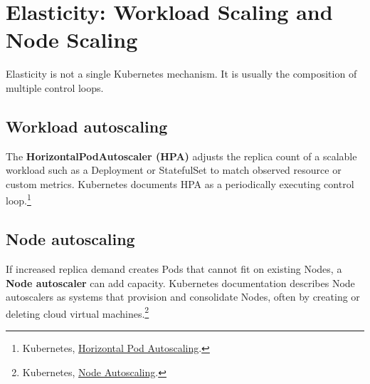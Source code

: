 \documentclass[11pt]{article}
\newcommand{\term}[1]{\textbf{\textcolor{KubeBlue}{#1}}}
\newcommand{\src}[2]{\href{#2}{#1}}
\begin{document}
\section{Elasticity: Workload Scaling and Node Scaling}

Elasticity is not a single Kubernetes mechanism. It is usually the composition of multiple control loops.

\subsection{Workload autoscaling}
The \term{HorizontalPodAutoscaler (HPA)} adjusts the replica count of a scalable workload such as a Deployment or StatefulSet to match observed resource or custom metrics. Kubernetes documents HPA as a periodically executing control loop.\footnote{Kubernetes, \src{Horizontal Pod Autoscaling}{https://kubernetes.io/docs/concepts/workloads/autoscaling/horizontal-pod-autoscale/}.}

\subsection{Node autoscaling}
If increased replica demand creates Pods that cannot fit on existing Nodes, a \term{Node autoscaler} can add capacity. Kubernetes documentation describes Node autoscalers as systems that provision and consolidate Nodes, often by creating or deleting cloud virtual machines.\footnote{Kubernetes, \src{Node Autoscaling}{https://kubernetes.io/docs/concepts/cluster-administration/node-autoscaling/}.}

\begin{center}
\end{center}
\end{document}
